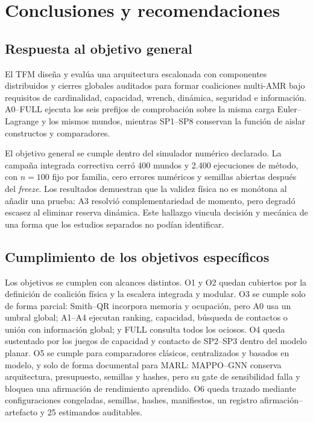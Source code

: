\section{Conclusiones y recomendaciones}

\subsection*{Respuesta al objetivo general}

El TFM diseña y evalúa una arquitectura escalonada con componentes distribuidos y cierres globales auditados para formar coaliciones multi-AMR bajo requisitos de cardinalidad, capacidad, wrench, dinámica, seguridad e información. A0--FULL ejecuta los seis prefijos de comprobación sobre la misma carga Euler--Lagrange y los mismos mundos, mientras SP1--SP8 conservan la función de aislar constructos y comparadores.

El objetivo general se cumple dentro del simulador numérico declarado. La campaña integrada correctiva cerró 400 mundos y 2.400 ejecuciones de método, con $n=100$ fijo por familia, cero errores numéricos y semillas abiertas después del \emph{freeze}. Los resultados demuestran que la validez física no es monótona al añadir una prueba: A3 resolvió complementariedad de momento, pero degradó escasez al eliminar reserva dinámica. Este hallazgo vincula decisión y mecánica de una forma que los estudios separados no podían identificar.
\subsection*{Cumplimiento de los objetivos específicos}

Los objetivos se cumplen con alcances distintos. O1 y O2 quedan cubiertos por la definición de coalición física y la escalera integrada y modular. O3 se cumple solo de forma parcial: Smith--QR incorpora memoria y ocupación, pero A0 usa un umbral global; A1--A4 ejecutan ranking, capacidad, búsqueda de contactos o unión con información global; y FULL consulta todos los ociosos. O4 queda sustentado por los juegos de capacidad y contacto de SP2--SP3 dentro del modelo planar. O5 se cumple para comparadores clásicos, centralizados y basados en modelo, y solo de forma documental para MARL: MAPPO--GNN conserva arquitectura, presupuesto, semillas y hashes, pero su gate de sensibilidad falla y bloquea una afirmación de rendimiento aprendido. O6 queda trazado mediante configuraciones congeladas, semillas, hashes, manifiestos, un registro afirmación--artefacto y 25 estimandos auditables.
